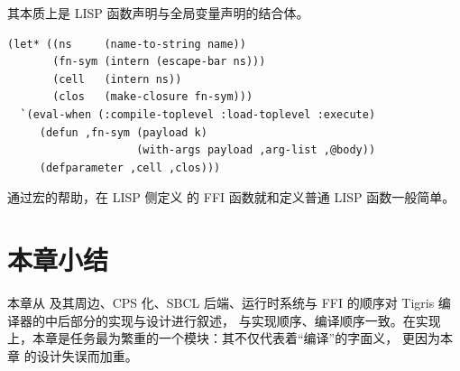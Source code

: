   \endgroup
  其本质上是 LISP 函数声明与全局变量声明的结合体。
\begin{verbatim}
(let* ((ns     (name-to-string name))
       (fn-sym (intern (escape-bar ns)))
       (cell   (intern ns))
       (clos   (make-closure fn-sym)))
  `(eval-when (:compile-toplevel :load-toplevel :execute)
     (defun ,fn-sym (payload k) 
                    (with-args payload ,arg-list ,@body))
     (defparameter ,cell ,clos)))
\end{verbatim}
  通过宏的帮助，在 LISP 侧定义 \Tigris 的 FFI 函数就和定义普通 LISP 函数一般简单。
  \section{本章小结}
  本章从 \Lambdair 及其周边、CPS 化、SBCL 后端、运行时系统与 FFI 的顺序对 Tigris 编译器的中后部分的实现与设计进行叙述，
  与实现顺序、编译顺序一致。在实现上，本章是任务最为繁重的一个模块：其不仅代表着“编译”的字面义，
  更因为本章 \Lambdair 的设计失误而加重。